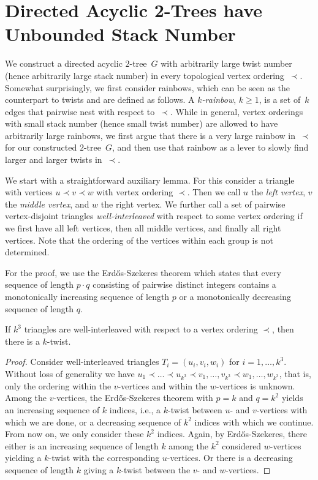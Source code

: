 \documentclass{theoretics}
\begin{document}
\section{Directed Acyclic 2-Trees have Unbounded Stack Number}
\label{sec:2trees}

We construct a directed acyclic $2$-tree~$G$ with arbitrarily large twist number (hence arbitrarily large stack number) in every topological vertex ordering~$\prec$.
Somewhat surprisingly, we first consider rainbows, which can be seen as the counterpart to twists and are defined as follows.
A \emph{$k$-rainbow}, $k \geq 1$, is a set of~$k$ edges that pairwise nest with respect to~$\prec$.
While in general, vertex orderings with small stack number (hence small twist number) are allowed to have arbitrarily large rainbows, we first argue that there is a very large rainbow in~$\prec$ for our constructed $2$-tree~$G$, and then use that rainbow as a lever to slowly find larger and larger twists in~$\prec$.

We start with a straightforward auxiliary lemma.
For this consider a triangle with vertices $ u \prec v \prec w $ with vertex ordering $ \prec $.
Then we call $ u $ the \emph{left vertex}, $ v $ the \emph{middle vertex}, and $ w $ the right vertex.
We further call a set of pairwise vertex-disjoint triangles \emph{well-interleaved} with respect to some vertex ordering if we first have all left vertices, then all middle vertices, and finally all right vertices.
Note that the ordering of the vertices within each group is not determined.

For the proof, we use the Erd\H{o}s-Szekeres theorem which states that every sequence of length $ p \cdot q $ consisting of pairwise distinct integers contains a monotonically increasing sequence of length $ p $ or a monotonically decreasing sequence of length $ q $.

\begin{lemma}
    \label{lem:triangles}
    If $ k^3 $ triangles are well-interleaved with respect to a vertex ordering $ \prec $, then there is a $ k $-twist.
\end{lemma}

\begin{proof}
    Consider well-interleaved triangles $ T_i = (u_i, v_i, w_i) $ for $ i = 1, \dots, k^3 $.
    Without loss of generality we have $ u_1 \prec \dots \prec u_{k^3} \prec v_1, \dots, v_{k^3} \prec w_1, \dots, w_{k^3} $, that is, only the ordering within the $ v $-vertices and within the $ w $-vertices is unknown.
    Among the $ v $-vertices, the Erd\H{o}s-Szekeres theorem with $ p = k $ and $ q = k^2 $ yields an increasing sequence of $ k $ indices, i.e., a $ k $-twist between $ u $- and $ v $-vertices with which we are done, or a decreasing sequence of $ k^2 $ indices with which we continue.
    From now on, we only consider these $ k^2 $ indices.
    Again, by Erd\H{o}s-Szekeres, there either is an increasing sequence of length $ k $ among the $ k^2 $ considered $ w $-vertices yielding a $ k $-twist with the corresponding $ u $-vertices.
    Or there is a decreasing sequence of length $ k $ giving a $ k $-twist between the $ v $- and $ w $-vertices.
\end{proof}
\end{document}
